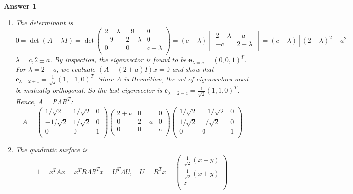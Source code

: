 \documentclass[a4paper]{article}
\newtheorem{ans}{Answer}[section]
\theoremstyle{new}
\begin{document}
\begin{ans}
\begin{enumerate}[label=(\alph*)]
where $\langle e_1|e_2\rangle=0$. $e_2$ is not assumed to be an eigenvector. Having to decompose the space into the direct sum of $\mathbf{e_1}$ and its orthogonal complement, we restrict ourselves to the $(n-1)\times(n-1)$ subspace where a copy of the degenerate eigenvalue $\lambda$ has been removed from the characteristic equation. We repeat the above process until each copy of the degenerate eigenvalue has been given an orthogonal eigenvector. This set of orthogonal eigenvectors is not unique. With this orthogonal basis, we can construct a matrix $P$ to diagonalize $H$.
\item The determinant is
$$0=\det(A-\lambda I)=\det\begin{pmatrix}2-\lambda&-9&0\\-9&2-\lambda&0\\0&0&c-\lambda\\\end{pmatrix}=(c-\lambda)\begin{vmatrix}2-\lambda&-a\\-a&2-\lambda\\\end{vmatrix}=(c-\lambda)[(2-\lambda)^2-a^2]$$
$\lambda=c,2\pm a$. By inspection, the eigenvector is found to be $\mathbf{e}_{\lambda=c}=(0,0,1)^T$. For $\lambda=2+a$, we evaluate $(A-(2+a)I)x=0$ and show that $\mathbf{e}_{\lambda=2+a}=\frac{1}{\sqrt{2}}(1,-1,0)^T$. Since $A$ is Hermitian, the set of eigenvectors must be mutually orthogonal. So the last eigenvector is $\mathbf{e}_{\lambda=2-a}=\frac{1}{\sqrt{2}}(1,1,0)^T$. Hence, $A=R\Lambda R^T$:
$$A=\begin{pmatrix}1/\sqrt{2}&1/\sqrt{2}&0\\-1/\sqrt{2}&1/\sqrt{2}&0\\0&0&1\\\end{pmatrix}\begin{pmatrix}2+a&0&0\\0&2-a&0\\0&0&c\\\end{pmatrix}\begin{pmatrix}1/\sqrt{2}&-1/\sqrt{2}&0\\1/\sqrt{2}&1/\sqrt{2}&0\\0&0&1\\\end{pmatrix}$$
\item The quadratic surface is 
$$1=x^TAx=x^TR\Lambda R^Tx=U^T\Lambda U,\quad U=R^Tx=\begin{pmatrix}\frac{1}{\sqrt{2}}(x-y)\\\frac{1}{\sqrt{2}}(x+y)\\z\\\end{pmatrix}$$

\end{enumerate}
\end{ans}
\end{document}
